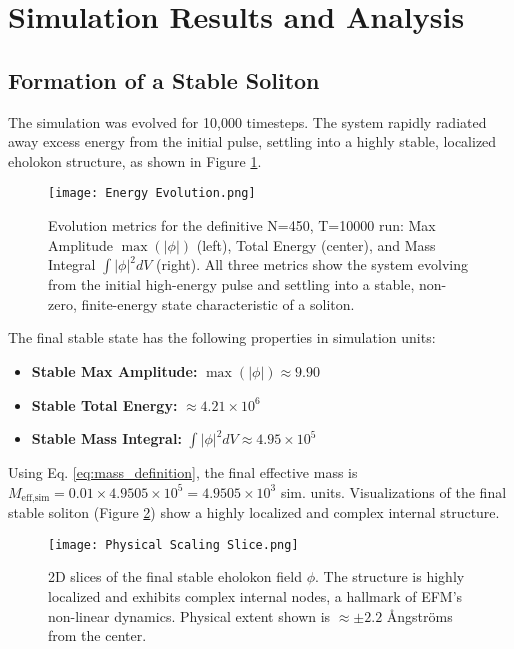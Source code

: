 \documentclass[11pt]{article}
\begin{document}
\section{Simulation Results and Analysis}
\subsection{Formation of a Stable Soliton}
The simulation was evolved for 10,000 timesteps. The system rapidly radiated away excess energy from the initial pulse, settling into a highly stable, localized eholokon structure, as shown in Figure \ref{fig:mass_gen_evolution}.

\begin{figure}[htbp]
    \centering
    \texttt{[image: Energy Evolution.png]} %
    \caption{Evolution metrics for the definitive N=450, T=10000 run: Max Amplitude \(\max(|\phi|)\) (left), Total Energy (center), and Mass Integral \(\int|\phi|^2dV\) (right). All three metrics show the system evolving from the initial high-energy pulse and settling into a stable, non-zero, finite-energy state characteristic of a soliton.}
    \label{fig:mass_gen_evolution}
\end{figure}

The final stable state has the following properties in simulation units:
\begin{itemize}
    \item \textbf{Stable Max Amplitude:} \(\max(|\phi|) \approx 9.90\)
    \item \textbf{Stable Total Energy:} \(\approx 4.21 \times 10^6\)
    \item \textbf{Stable Mass Integral:} \(\int|\phi|^2dV \approx 4.95 \times 10^5\)
\end{itemize}
Using Eq. \ref{eq:mass_definition}, the final effective mass is \(M_{\text{eff,sim}} = 0.01 \times 4.9505 \times 10^5 = 4.9505 \times 10^3\) sim. units. Visualizations of the final stable soliton (Figure \ref{fig:soliton_slices_zoomed}) show a highly localized and complex internal structure.

\begin{figure}[htbp]
    \centering
    \texttt{[image: Physical Scaling Slice.png]} %
    \caption{2D slices of the final stable eholokon field \(\phi\). The structure is highly localized and exhibits complex internal nodes, a hallmark of EFM's non-linear dynamics. Physical extent shown is \(\approx \pm 2.2\) Ångströms from the center.}
    \label{fig:soliton_slices_zoomed}
\end{figure}
\end{document}
